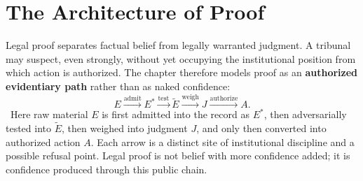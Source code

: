 
\chapter{The Architecture of Proof}
\label{ch:ch035}

Legal proof separates factual belief from legally warranted judgment. A tribunal may suspect, even strongly, without yet occupying the institutional position from which action is authorized. The chapter therefore models proof as an \textbf{authorized evidentiary path} rather than as naked confidence:
\[
E
\xrightarrow{\operatorname{admit}}
E^\ast
\xrightarrow{\operatorname{test}}
\widetilde E
\xrightarrow{\operatorname{weigh}}
J
\xrightarrow{\operatorname{authorize}}
A.
\]
\Definition\ Here raw material \(E\) is first admitted into the record as \(E^\ast\), then adversarially tested into \(\widetilde E\), then weighed into judgment \(J\), and only then converted into authorized action \(A\).
Each arrow is a distinct site of institutional discipline and a possible refusal point. Legal proof is not belief with more confidence added; it is confidence produced through this public chain.
